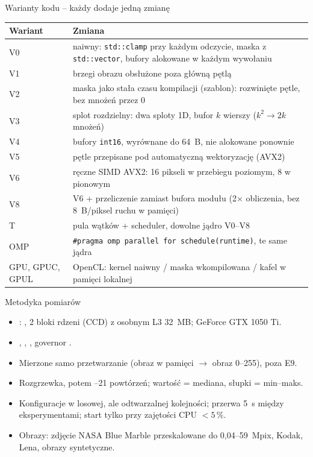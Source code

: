 \documentclass[aspectratio=169,11pt]{beamer}
\newcommand{\kod}[1]{\texttt{#1}}
\newcommand{\x}{$\times$}
\begin{document}
\begin{frame}{Warianty kodu -- każdy dodaje jedną zmianę}
	\footnotesize
	\begin{tabular}{@{}lp{}@{}}
		\toprule
		Wariant & Zmiana \\
		\midrule
		V0 & naiwny: \kod{std::clamp} przy każdym odczycie, maska z \kod{std::vector}, bufory alokowane w każdym wywołaniu \\
		V1 & brzegi obrazu obsłużone poza główną pętlą \\
		V2 & maska jako stała czasu kompilacji (szablon): rozwinięte pętle, bez mnożeń przez 0 \\
		V3 & splot rozdzielny: dwa sploty 1D, bufor $k$ wierszy ($k^2 \to 2k$ mnożeń) \\
		V4 & bufory \kod{int16}, wyrównane do 64~B, nie alokowane ponownie \\
		V5 & pętle przepisane pod automatyczną wektoryzację (AVX2) \\
		V6 & ręczne SIMD AVX2: 16 pikseli w przebiegu poziomym, 8 w pionowym \\
		V8 & V6 + przeliczenie zamiast bufora modułu (2\x{} obliczenia, bez 8~B/piksel ruchu w pamięci) \\
		\midrule
		T & pula wątków + scheduler, dowolne jądro V0--V8 \\
		OMP & \kod{\#pragma omp parallel for schedule(runtime)}, te same jądra \\
		GPU, GPUC, GPUL & OpenCL: kernel naiwny / maska wkompilowana / kafel w pamięci lokalnej \\
		\bottomrule
	\end{tabular}
\end{frame}

\begin{frame}{Metodyka pomiarów}
	\begin{itemize}
		\item {}: , 2 bloki rdzeni (CCD) z osobnym L3 32~MB; GeForce GTX 1050 Ti.
		\item {}, , , governor .
		\item Mierzone samo przetwarzanie (obraz w pamięci $\to$ obraz 0--255), poza E9.
		\item Rozgrzewka, potem --21 powtórzeń; wartość = mediana, słupki = min--maks.
		\item Konfiguracje w losowej, ale odtwarzalnej kolejności; przerwa 5~s między eksperymentami; start tylko przy zajętości CPU $< 5\,\%$.
		\item Obrazy: zdjęcie NASA Blue Marble przeskalowane do 0,04--59~Mpix, Kodak, Lena, obrazy syntetyczne.
	\end{itemize}
\end{frame}
\end{document}
